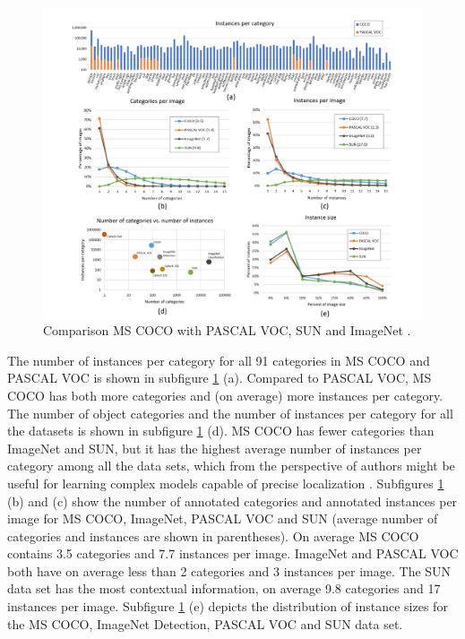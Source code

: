 \documentclass[
]{krantz}
\begin{document}
\begin{figure}

{\centering \includegraphics[width=1\linewidth]{figures/02-01/2.1 coco comparison} 

}

\caption{Comparison MS COCO with PASCAL VOC, SUN and ImageNet \citep{mccoco}.}\label{fig:cococomparison}
\end{figure}



The number of instances per category for all 91 categories in MS COCO and PASCAL VOC is shown in subfigure \ref{fig:cococomparison} (a). Compared to PASCAL VOC, MS COCO has both more categories and (on average) more instances per category. The number of object categories and the number of instances per category for all the datasets is shown in subfigure \ref{fig:cococomparison} (d). MS COCO has fewer categories than ImageNet and SUN, but it has the highest average number of instances per category among all the data sets, which from the perspective of authors might be useful for learning complex models capable of precise localization \citep{mccoco}.
Subfigures \ref{fig:cococomparison} (b) and (c) show the number of annotated categories and annotated instances per image for MS COCO, ImageNet, PASCAL VOC and SUN (average number of categories and instances are shown in parentheses). On average MS COCO contains 3.5 categories and 7.7 instances per image. ImageNet and PASCAL VOC both have on average less than 2 categories and 3 instances per image. The SUN data set has the most contextual information, on average 9.8 categories and 17 instances per image. Subfigure \ref{fig:cococomparison} (e) depicts the distribution of instance sizes for the MS COCO, ImageNet Detection, PASCAL VOC and SUN data set.
\end{document}
